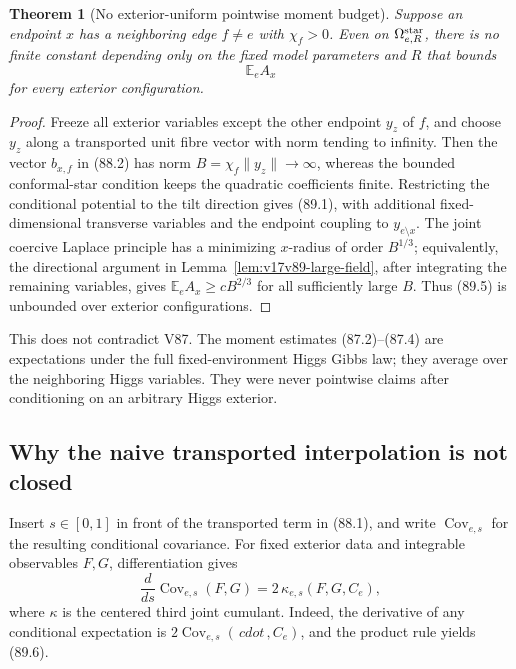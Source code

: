 \documentclass[11pt]{article}
\newtheorem{theorem}{Theorem}[section]
\theoremstyle{remark}
\begin{document}
\begin{theorem}[No exterior-uniform pointwise moment budget]
\label{thm:v17v89-no-uniform}
Suppose an endpoint \(x\) has a neighboring edge \(f\ne e\) with
\(\chi_f>0\).  Even on \(\Omega_{e,R}^{\rm star}\), there is no finite
constant depending only on the fixed model parameters and \(R\) that
bounds
\[
 \mathbb E_e A_x                                      \tag{89.5}
\]
for every exterior configuration.
\end{theorem}

\begin{proof}
Freeze all exterior variables except the other endpoint \(y_z\) of
\(f\), and choose \(y_z\) along a transported unit fibre vector with
norm tending to infinity.  Then the vector \(b_{x,f}\) in (88.2) has
norm \(B=\chi_f\|y_z\|\to\infty\), whereas the bounded conformal-star
condition keeps the quadratic coefficients finite.  Restricting the
conditional potential to the tilt direction gives (89.1), with
additional fixed-dimensional transverse variables and the endpoint
coupling to \(y_{e\setminus x}\).  The joint coercive Laplace principle
has a minimizing \(x\)-radius of order \(B^{1/3}\); equivalently, the
directional argument in Lemma~\ref{lem:v17v89-large-field}, after
integrating the remaining variables, gives
\(\mathbb E_eA_x\geq cB^{2/3}\) for all sufficiently large \(B\).
Thus (89.5) is unbounded over exterior configurations.
\end{proof}

This does not contradict V87.  The moment estimates (87.2)--(87.4)
are expectations under the full fixed-environment Higgs Gibbs law;
they average over the neighboring Higgs variables.  They were never
pointwise claims after conditioning on an arbitrary Higgs exterior.

\subsection{Why the naive transported interpolation is not closed}

Insert \(s\in[0,1]\) in front of the transported term in (88.1), and
write \(\operatorname{Cov}_{e,s}\) for the resulting conditional
covariance.  For fixed exterior data and integrable observables
\(F,G\), differentiation gives
\[
 \frac d{ds}\operatorname{Cov}_{e,s}(F,G)
 =2\,\kappa_{e,s}(F,G,C_e),                          \tag{89.6}
\]
where \(\kappa\) is the centered third joint cumulant.  Indeed, the
derivative of any conditional expectation is
\(2\operatorname{Cov}_{e,s}(\,cdot\,,C_e)\), and
the product rule yields (89.6).
\end{document}
